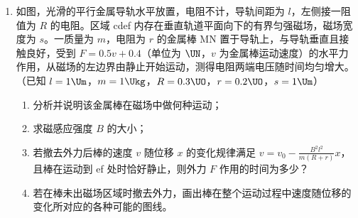\documentclass[\gkver]{gaokaozhenti}
\begin{document}
\begin{enumerate}
\item
如图，光滑的平行金属导轨水平放置，电阻不计，导轨间距为 $l$，左侧接一阻值为 $R$ 的电阻。区域 cdef 内存在垂直轨道平面向下的有界匀强磁场，磁场宽度为 $s$。一质量为 $m$，电阻为 $r$ 的金属棒 MN 置于导轨上，与导轨垂直且接触良好，受到 $F = 0.5v + 0.4$（单位为 $\UN$，$v$ 为金属棒运动速度）的水平力作用，从磁场的左边界由静止开始运动，测得电阻两端电压随时间均匀增大。（已知 $l = 1\Um$，$m = 1\Ukg$，$R = 0.3\UO$，$r = 0.2\UO$，$s = 1\Um$）
\begin{enumerate}
	\item
	分析并说明该金属棒在磁场中做何种运动；
	\item
	求磁感应强度 $B$ 的大小；
	\item
	若撤去外力后棒的速度 $v$ 随位移 $x$ 的变化规律满足 $v = v_{0} - \frac{B^{2}l^{2}}{m(R + r)}x$，且棒在运动到 ef 处时恰好静止，则外力 $F$ 作用的时间为多少？
	\item
	若在棒未出磁场区域时撤去外力，画出棒在整个运动过程中速度随位移的变化所对应的各种可能的图线。
\end{enumerate}
\onepicture[align=right, w=4.99cm]{}

\end{enumerate}
\end{document}
